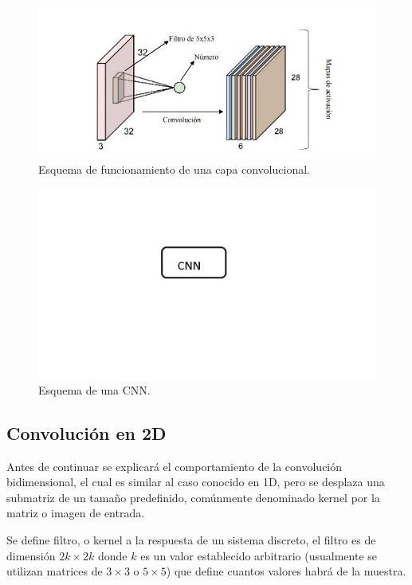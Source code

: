 \begin{figure}
    \centering
    \includegraphics[width=1\textwidth]{imgs/capa-convolucional.jpeg}
    \caption{Esquema de funcionamiento de una capa convolucional.}
    \label{fig:esquema-capa-convolucional}
\end{figure}
\begin{figure}
    \centering
    \includegraphics[width=1\textwidth]{imgs/CNN-completa.jpg}
    \caption{Esquema de una CNN.}
    \label{fig:esquema-CNN}
\end{figure}

\subsection{Convolución en 2D}

Antes de continuar se explicará el comportamiento de la convolución bidimensional, el cual es similar al caso conocido en 1D, pero se desplaza una submatriz de un tamaño predefinido, comúnmente denominado kernel por la matriz o imagen de entrada.

Se define filtro, o kernel a la respuesta de un sistema discreto, el filtro es de dimensión $2k \times 2k$ donde $k$ es un
valor establecido arbitrario (usualmente se utilizan matrices de $3 \times 3$ o $5 \times 5$) que define cuantos valores habrá de la muestra.

